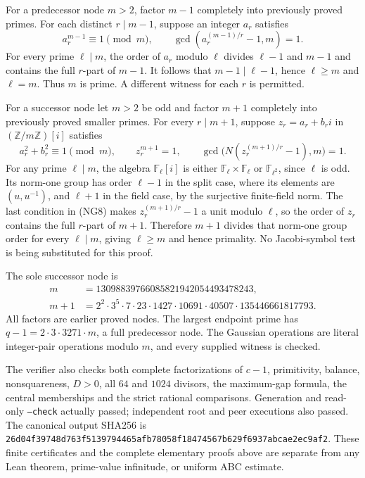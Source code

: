 For a predecessor node $m>2$, factor $m-1$ completely into previously
proved primes. For each distinct $r\mid m-1$, suppose an integer
$a_r$ satisfies
\[
 a_r^{m-1}\equiv1\pmod m,\qquad
 \gcd(a_r^{(m-1)/r}-1,m)=1.
\]
For every prime $\ell\mid m$, the order of $a_r$ modulo $\ell$
divides $\ell-1$ and $m-1$ and contains the full $r$-part of $m-1$.
It follows that $m-1\mid\ell-1$, hence $\ell\geq m$ and $\ell=m$.
Thus $m$ is prime. A different witness for each $r$ is permitted.

For a successor node let $m>2$ be odd and factor $m+1$ completely
into previously proved smaller primes. For every $r\mid m+1$,
suppose $z_r=a_r+b_ri$ in $(\mathbb Z/m\mathbb Z)[i]$ satisfies
\[
 a_r^2+b_r^2\equiv1\pmod m,\qquad z_r^{m+1}=1,\qquad
 \gcd\bigl(N(z_r^{(m+1)/r}-1),m\bigr)=1.             \tag{NG8}
\]
For any prime $\ell\mid m$, the algebra $\mathbb F_\ell[i]$ is
either $\mathbb F_\ell\times\mathbb F_\ell$ or
$\mathbb F_{\ell^2}$, since $\ell$ is odd. Its norm-one group has
order $\ell-1$ in the split case, where its elements are
$(u,u^{-1})$, and $\ell+1$ in the field case, by the surjective
finite-field norm. The last condition in (NG8) makes
$z_r^{(m+1)/r}-1$ a unit modulo $\ell$, so the order of $z_r$ contains
the full $r$-part of $m+1$. Therefore $m+1$ divides that norm-one
group order for every $\ell\mid m$, giving $\ell\geq m$ and hence
primality. No Jacobi-symbol test is being substituted for this proof.

The sole successor node is
\[
 \begin{split}
 m&=13098839766085821942054493478243,\\
 m+1&=2^2\cdot3^5\cdot7\cdot23\cdot1427\cdot10691
       \cdot40507\cdot135446661817793.
 \end{split}
\]
All factors are earlier proved nodes. The largest endpoint prime
has $q-1=2\cdot3\cdot3271\cdot m$, a full predecessor node.
The Gaussian operations are literal integer-pair operations modulo
$m$, and every supplied witness is checked.

The verifier also checks both complete factorizations of $c-1$,
primitivity, balance, nonsquareness, $D>0$, all $64$ and $1024$
divisors, the maximum-gap formula, the central memberships and the
strict rational comparisons. Generation and read-only
\texttt{--check} actually passed; independent root and peer executions
also passed. The canonical output SHA256 is
\texttt{26d04f39748d763f\allowbreak{}5139794465afb780\allowbreak{}58f18474567b629f\allowbreak{}6937abcae2ec9af2}.
These finite certificates and the complete elementary proofs above
are separate from any Lean theorem, prime-value infinitude, or
uniform ABC estimate.
